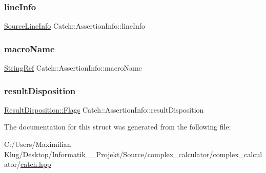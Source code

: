 \mbox{\label{struct_catch_1_1_assertion_info_a17bdbb404ba12658034f833be2f4c3e7}} 
\subsubsection{\texorpdfstring{line\+Info}{lineInfo}}
{\footnotesize\ttfamily \mbox{\hyperlink{struct_catch_1_1_source_line_info}{Source\+Line\+Info}} Catch\+::\+Assertion\+Info\+::line\+Info}

\mbox{\label{struct_catch_1_1_assertion_info_aaf3fbb9f1fe09c879ba3d877584e3056}} 
\subsubsection{\texorpdfstring{macro\+Name}{macroName}}
{\footnotesize\ttfamily \mbox{\hyperlink{class_catch_1_1_string_ref}{String\+Ref}} Catch\+::\+Assertion\+Info\+::macro\+Name}

\mbox{\label{struct_catch_1_1_assertion_info_a60353b3632ab2f827162f2b2d6911073}} 
\subsubsection{\texorpdfstring{result\+Disposition}{resultDisposition}}
{\footnotesize\ttfamily \mbox{\hyperlink{struct_catch_1_1_result_disposition_a3396cad6e2259af326b3aae93e23e9d8}{Result\+Disposition\+::\+Flags}} Catch\+::\+Assertion\+Info\+::result\+Disposition}



The documentation for this struct was generated from the following file\+:\begin{DoxyCompactItemize}
\item 
C\+:/\+Users/\+Maximilian Klug/\+Desktop/\+Informatik\+\_\+\_\+\+Projekt/\+Source/complex\+\_\+calculator/complex\+\_\+calculator/\mbox{\hyperlink{catch_8hpp}{catch.\+hpp}}\end{DoxyCompactItemize}
